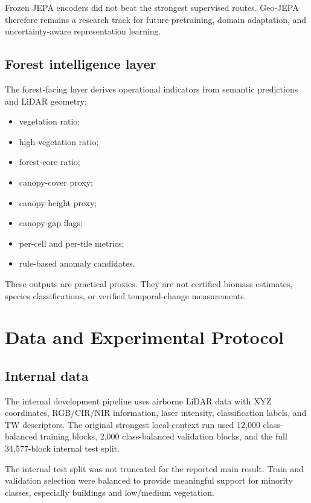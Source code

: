 \documentclass[11pt,a4paper]{article}
\begin{document}
Frozen JEPA encoders did not beat the strongest supervised routes. Geo-JEPA therefore remains a research track for future pretraining, domain adaptation, and uncertainty-aware representation learning.

\subsection{Forest intelligence layer}

The forest-facing layer derives operational indicators from semantic predictions and LiDAR geometry:

\begin{itemize}
  \item vegetation ratio;
  \item high-vegetation ratio;
  \item forest-core ratio;
  \item canopy-cover proxy;
  \item canopy-height proxy;
  \item canopy-gap flags;
  \item per-cell and per-tile metrics;
  \item rule-based anomaly candidates.
\end{itemize}

These outputs are practical proxies. They are not certified biomass estimates, species classifications, or verified temporal-change measurements.

\section{Data and Experimental Protocol}

\subsection{Internal data}

The internal development pipeline uses airborne LiDAR data with XYZ coordinates, RGB/CIR/NIR information, laser intensity, classification labels, and TW descriptors. The original strongest local-context run used 12,000 class-balanced training blocks, 2,000 class-balanced validation blocks, and the full 34,577-block internal test split.

The internal test split was not truncated for the reported main result. Train and validation selection were balanced to provide meaningful support for minority classes, especially buildings and low/medium vegetation.
\end{document}
